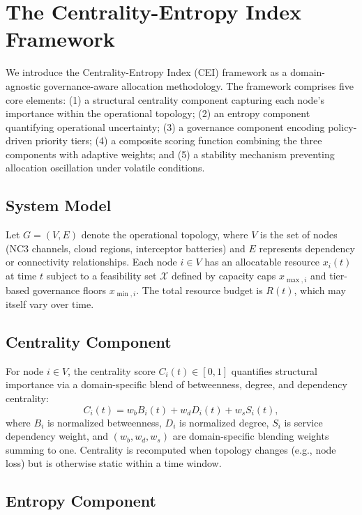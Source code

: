 \documentclass[runningheads]{llncs}
\begin{document}
\section{The Centrality-Entropy Index Framework}
\label{sec:framework}

We introduce the Centrality-Entropy Index (CEI) framework as a domain-agnostic governance-aware allocation methodology. The framework comprises five core elements: (1) a structural centrality component capturing each node's importance within the operational topology; (2) an entropy component quantifying operational uncertainty; (3) a governance component encoding policy-driven priority tiers; (4) a composite scoring function combining the three components with adaptive weights; and (5) a stability mechanism preventing allocation oscillation under volatile conditions.

\subsection{System Model}

Let $G = (V, E)$ denote the operational topology, where $V$ is the set of nodes (NC3 channels, cloud regions, interceptor batteries) and $E$ represents dependency or connectivity relationships. Each node $i \in V$ has an allocatable resource $x_i(t)$ at time $t$ subject to a feasibility set $\mathcal{X}$ defined by capacity caps $x_{\max,i}$ and tier-based governance floors $x_{\min,i}$. The total resource budget is $R(t)$, which may itself vary over time.

\subsection{Centrality Component}

For node $i \in V$, the centrality score $C_i(t) \in [0,1]$ quantifies structural importance via a domain-specific blend of betweenness, degree, and dependency centrality:
\begin{equation}
C_i(t) = w_b B_i(t) + w_d D_i(t) + w_s S_i(t),
\end{equation}
where $B_i$ is normalized betweenness, $D_i$ is normalized degree, $S_i$ is service dependency weight, and $(w_b, w_d, w_s)$ are domain-specific blending weights summing to one. Centrality is recomputed when topology changes (e.g., node loss) but is otherwise static within a time window.

\subsection{Entropy Component}
\end{document}
